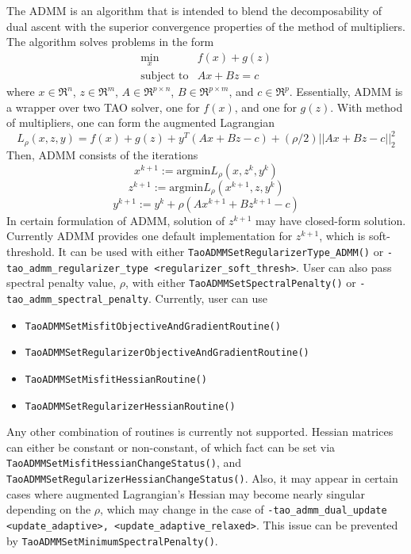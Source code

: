 The ADMM is an algorithm that is intended to blend the decomposability
of dual ascent with the superior convergence properties of the
method of multipliers. \cite{boyd} 
The algorithm solves problems in the form
\[
\begin{array}{ll}
\displaystyle \min_{x} & f(x) + g(z) \\ 
\mbox{subject to} & Ax + Bz = c
\end{array}
\]
where $x \in \Re^n$, $z \in \Re^m$, $A \in \Re^{p \times n}$, $B \in \Re^{p \times m}$, and $c \in \Re^p$.
Essentially, ADMM is a wrapper over two TAO solver, one for $f(x)$, and one for $g(z)$.
With method of multipliers, one can form the augmented Lagrangian 
\begin{equation}
L_{\rho}(x,z,y) = f(x) + g(z) + y^T(Ax+Bz-c) + (\rho/2)||Ax+Bz-c||_2^2
\end{equation}
Then, ADMM consists of the iterations
\begin{equation}
x^{k+1} := \text{argmin}L_{\rho}(x,z^k,y^k)
\end{equation}
\begin{equation}
z^{k+1} := \text{argmin}L_{\rho}(x^{k+1},z,y^k)
\end{equation}
\begin{equation}
y^{k+1} := y^k + \rho(Ax^{k+1}+Bz^{k+1}-c)
\end{equation}
In certain formulation of ADMM, solution of $z^{k+1}$ may have closed-form solution. 
Currently ADMM provides one default implementation for $z^{k+1}$, which is soft-threshold. 
It can be used with either {\tt TaoADMMSetRegularizerType\_ADMM()} or
\texttt{-tao\_admm\_regularizer\_type <regularizer\_soft\_thresh>}.
User can also pass spectral penalty value, $\rho$, with either {\tt TaoADMMSetSpectralPenalty()} or
\texttt{-tao\_admm\_spectral\_penalty}.
Currently, user can use
\begin{itemize}
\item {\tt TaoADMMSetMisfitObjectiveAndGradientRoutine()}
\item {\tt TaoADMMSetRegularizerObjectiveAndGradientRoutine()}
\item {\tt TaoADMMSetMisfitHessianRoutine()}
\item {\tt TaoADMMSetRegularizerHessianRoutine()}
\end{itemize}
Any other combination of routines is currently not supported. Hessian matrices can either be constant or non-constant,
of which fact can be set via {\tt TaoADMMSetMisfitHessianChangeStatus()}, and {\tt TaoADMMSetRegularizerHessianChangeStatus()}.
Also, it may appear in certain cases where augmented Lagrangian's Hessian may become nearly singular depending on the 
$\rho$, which may change in the case of \texttt{-tao\_admm\_dual\_update <update\_adaptive>, <update\_adaptive\_relaxed>}.
This issue can be prevented by {\tt TaoADMMSetMinimumSpectralPenalty()}.

